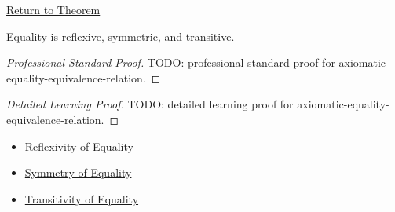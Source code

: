 \newpage
{}
\label{prf:axiomatic-equality-equivalence-relation}

\begin{remark*}[Return]
\hyperref[thm:axiomatic-equality-equivalence-relation]{Return to Theorem}
\end{remark*}

\begin{theorem*}
Equality is reflexive, symmetric, and transitive.
\end{theorem*}

\begin{proof}[Professional Standard Proof]
\LRAProofBodyStart
TODO: professional standard proof for axiomatic-equality-equivalence-relation.
\end{proof}

\begin{proof}[Detailed Learning Proof]
\LRAProofBodyStart
TODO: detailed learning proof for axiomatic-equality-equivalence-relation.
\end{proof}

\begin{remark*}
\end{remark*}

\begin{dependencies}
\begin{itemize}
  \item \hyperref[ax:axiomatic-equality-reflexivity]{Reflexivity of Equality}
  \item \hyperref[thm:axiomatic-equality-symmetry]{Symmetry of Equality}
  \item \hyperref[thm:axiomatic-equality-transitivity]{Transitivity of Equality}
\end{itemize}
\end{dependencies}

\clearpage
